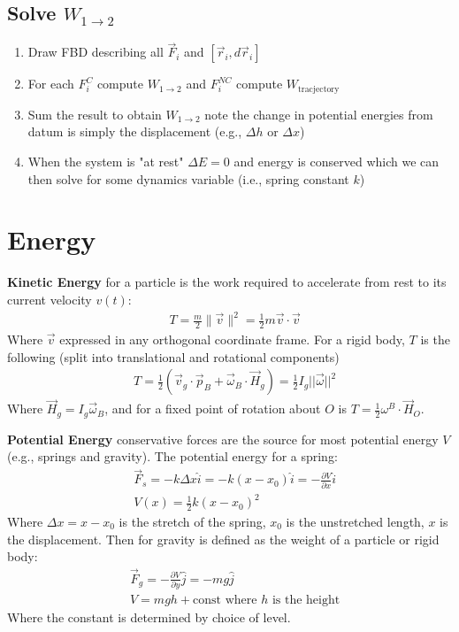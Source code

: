 \documentclass[conference]{IEEEtran}
\begin{document}
\subsection{Solve $W_{1 \to 2}$}
\begin{enumerate}
    \item Draw FBD describing all $\vec{F}_i$ and $[\vec{r}_i, d\vec{r}_i]$
    \item For each $F_i^C$ compute $W_{1\to2}$ and $F_i^{NC}$ compute $W_{\text{tracjectory}}$
    \item Sum the result to obtain $W_{1 \to 2}$ note the change in potential energies from datum is simply the displacement (e.g., $\Delta h$ or $\Delta x$)
    \item When the system is "at rest" $\Delta E = 0$ and energy is conserved which we can then solve for some dynamics variable (i.e., spring constant $k$)
\end{enumerate}
\section{Energy}
\textbf{Kinetic Energy} for a particle is the work required to accelerate from rest to its current velocity $v(t)$:
\begin{align}
    & T = \frac{m}{2}\|\vec{v}\|^2 = \frac{1}{2}m \vec{v} \cdot \vec{v}
\end{align}
Where $\vec{v}$ expressed in any orthogonal coordinate frame. For a rigid body, $T$ is the following (split into translational and rotational components)
\begin{align}
    & T = \frac{1}{2}(\vec{v}_g \cdot \vec{p}_B + \vec{\omega}_B \cdot \vec{H}_g) = \frac{1}{2}I_g ||\vec{\omega}||^2
\end{align}
Where $\vec{H}_g = I_g \vec{\omega}_B$, and for a fixed point of rotation about $O$ is $T = \frac{1}{2}\omega^B \cdot \vec{H}_O$.

\textbf{Potential Energy} conservative forces are the source for most potential energy $V$ (e.g., springs and gravity). The potential energy for a spring:
\begin{align}
    & \vec{F}_s = -k \Delta x \hat{i} = -k(x - x_0)\hat{i} = -\frac{\partial V}{\partial x} \hat{i} \\
    & V(x) = \frac{1}{2} k (x - x_0)^2
\end{align}
Where $\Delta x = x - x_0$ is the stretch of the spring, $x_0$ is the unstretched length, $x$ is the displacement. Then for gravity is defined as the weight of a particle or rigid body:
\begin{align}
    & \vec{F}_g = -\frac{\partial V}{\partial y} \hat{j} = - m g \hat{j} \\
    & V = m g h + \text{const} \text{ where $h$ is the height}
\end{align}
Where the constant is determined by choice of level.
\end{document}
